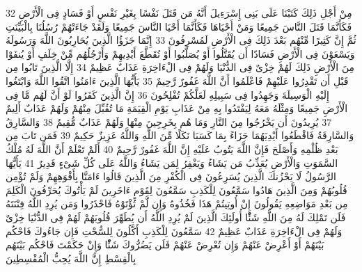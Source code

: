{\tiny\colorbox{cl_aya}{32}} مِنْ أَجْلِ ذَلِكَ كَتَبْنَا عَلَى بَنِى إِسْرَءِيلَ أَنَّهُ مَن قَتَلَ نَفْسًا بِغَيْرِ نَفْسٍ أَوْ فَسَادٍ فِى الْأَرْضِ فَكَأَنَّمَا قَتَلَ النَّاسَ جَمِيعًا وَمَنْ أَحْيَاهَا فَكَأَنَّمَا أَحْيَا النَّاسَ جَمِيعًا وَلَقَدْ جَاءَتْهُمْ رُسُلُنَا بِالْبَيِّنَتِ ثُمَّ إِنَّ كَثِيرًا مِّنْهُم بَعْدَ ذَلِكَ فِى الْأَرْضِ لَمُسْرِفُونَ
{\tiny\colorbox{cl_aya}{33}} إِنَّمَا جَزَؤُا الَّذِينَ يُحَارِبُونَ اللَّهَ وَرَسُولَهُ وَيَسْعَوْنَ فِى الْأَرْضِ فَسَادًا أَن يُقَتَّلُوا أَوْ يُصَلَّبُوا أَوْ تُقَطَّعَ أَيْدِيهِمْ وَأَرْجُلُهُم مِّنْ خِلَفٍ أَوْ يُنفَوْا مِنَ الْأَرْضِ ذَلِكَ لَهُمْ خِزْىٌ فِى الدُّنْيَا وَلَهُمْ فِى الْءَاخِرَةِ عَذَابٌ عَظِيمٌ
{\tiny\colorbox{cl_aya}{34}} إِلَّا الَّذِينَ تَابُوا مِن قَبْلِ أَن تَقْدِرُوا عَلَيْهِمْ فَاعْلَمُوا أَنَّ اللَّهَ غَفُورٌ رَّحِيمٌ
{\tiny\colorbox{cl_aya}{35}} يَأَيُّهَا الَّذِينَ ءَامَنُوا اتَّقُوا اللَّهَ وَابْتَغُوا إِلَيْهِ الْوَسِيلَةَ وَجَهِدُوا فِى سَبِيلِهِ لَعَلَّكُمْ تُفْلِحُونَ
{\tiny\colorbox{cl_aya}{36}} إِنَّ الَّذِينَ كَفَرُوا لَوْ أَنَّ لَهُم مَّا فِى الْأَرْضِ جَمِيعًا وَمِثْلَهُ مَعَهُ لِيَفْتَدُوا بِهِ مِنْ عَذَابِ يَوْمِ الْقِيَمَةِ مَا تُقُبِّلَ مِنْهُمْ وَلَهُمْ عَذَابٌ أَلِيمٌ
{\tiny\colorbox{cl_aya}{37}} يُرِيدُونَ أَن يَخْرُجُوا مِنَ النَّارِ وَمَا هُم بِخَرِجِينَ مِنْهَا وَلَهُمْ عَذَابٌ مُّقِيمٌ
{\tiny\colorbox{cl_aya}{38}} وَالسَّارِقُ وَالسَّارِقَةُ فَاقْطَعُوا أَيْدِيَهُمَا جَزَاءً بِمَا كَسَبَا نَكَلًا مِّنَ اللَّهِ وَاللَّهُ عَزِيزٌ حَكِيمٌ
{\tiny\colorbox{cl_aya}{39}} فَمَن تَابَ مِن بَعْدِ ظُلْمِهِ وَأَصْلَحَ فَإِنَّ اللَّهَ يَتُوبُ عَلَيْهِ إِنَّ اللَّهَ غَفُورٌ رَّحِيمٌ
{\tiny\colorbox{cl_aya}{40}} أَلَمْ تَعْلَمْ أَنَّ اللَّهَ لَهُ مُلْكُ السَّمَوَتِ وَالْأَرْضِ يُعَذِّبُ مَن يَشَاءُ وَيَغْفِرُ لِمَن يَشَاءُ وَاللَّهُ عَلَى كُلِّ شَىْءٍ قَدِيرٌ
{\tiny\colorbox{cl_aya}{41}} يَأَيُّهَا الرَّسُولُ لَا يَحْزُنكَ الَّذِينَ يُسَرِعُونَ فِى الْكُفْرِ مِنَ الَّذِينَ قَالُوا ءَامَنَّا بِأَفْوَهِهِمْ وَلَمْ تُؤْمِن قُلُوبُهُمْ وَمِنَ الَّذِينَ هَادُوا سَمَّعُونَ لِلْكَذِبِ سَمَّعُونَ لِقَوْمٍ ءَاخَرِينَ لَمْ يَأْتُوكَ يُحَرِّفُونَ الْكَلِمَ مِن بَعْدِ مَوَاضِعِهِ يَقُولُونَ إِنْ أُوتِيتُمْ هَذَا فَخُذُوهُ وَإِن لَّمْ تُؤْتَوْهُ فَاحْذَرُوا وَمَن يُرِدِ اللَّهُ فِتْنَتَهُ فَلَن تَمْلِكَ لَهُ مِنَ اللَّهِ شَئًْا أُولَئِكَ الَّذِينَ لَمْ يُرِدِ اللَّهُ أَن يُطَهِّرَ قُلُوبَهُمْ لَهُمْ فِى الدُّنْيَا خِزْىٌ وَلَهُمْ فِى الْءَاخِرَةِ عَذَابٌ عَظِيمٌ
{\tiny\colorbox{cl_aya}{42}} سَمَّعُونَ لِلْكَذِبِ أَكَّلُونَ لِلسُّحْتِ فَإِن جَاءُوكَ فَاحْكُم بَيْنَهُمْ أَوْ أَعْرِضْ عَنْهُمْ وَإِن تُعْرِضْ عَنْهُمْ فَلَن يَضُرُّوكَ شَئًْا وَإِنْ حَكَمْتَ فَاحْكُم بَيْنَهُم بِالْقِسْطِ إِنَّ اللَّهَ يُحِبُّ الْمُقْسِطِينَ
